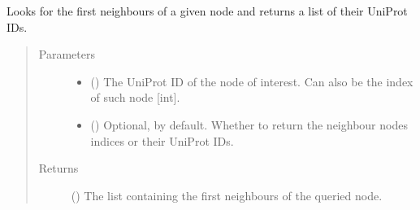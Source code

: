 \documentclass[letterpaper,10pt,english]{sphinxmanual}
\begin{document}
\begin{fulllineitems}
\begin{fulllineitems}
\label{\detokenize{reference:pypath.main.PyPath.first_neighbours}}
Looks for the first neighbours of a given node and returns a
list of their UniProt IDs.
\begin{quote}\begin{description}
\item[{Parameters}] \leavevmode\begin{itemize}
\item {} 
 () \textendash{} The UniProt ID of the node of interest. Can also be the
index of such node {[}int{]}.

\item {} 
 () \textendash{} Optional,  by default. Whether to return the
neighbour nodes indices or their UniProt IDs.

\end{itemize}

\item[{Returns}] \leavevmode
() \textendash{} The list containing the first neighbours of the
queried node.

\end{description}\end{quote}

\end{fulllineitems}



\end{fulllineitems}
\end{document}
